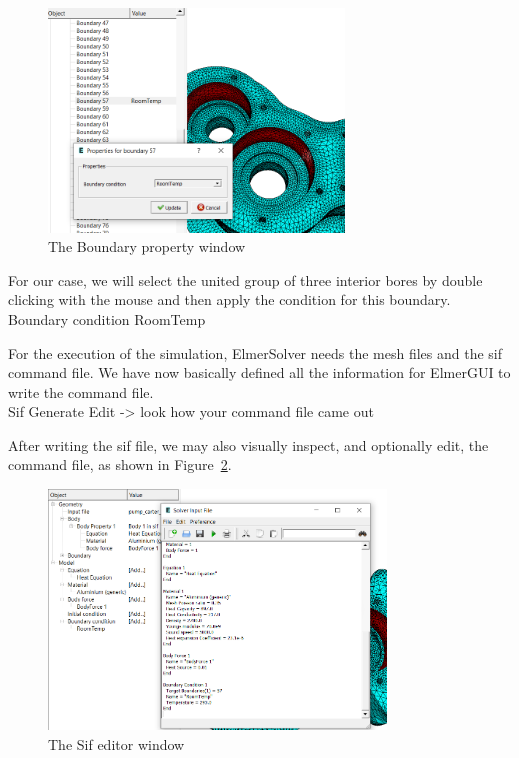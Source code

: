 \begin{figure}[H]
\begin{center}
\includegraphics[width=0.7\textwidth]{step-07}
\caption{The Boundary property window}\label{fg:step-07}
\end{center}
\end{figure}

For our case, we will select the united group of three interior bores by double clicking with the mouse and then apply the condition for this boundary.
\ttbegin
Boundary condition
  RoomTemp
\ttend

For the execution of the simulation, ElmerSolver needs the mesh files and the sif command file. We have now basically defined all the information for ElmerGUI to write the command file.\\

\ttbegin
Sif 
  Generate
  Edit -> look how your command file came out  
\ttend

After writing the sif file, we may also visually inspect, and optionally edit, the command file, as shown in Figure~\ref{fg:step-08}.

\begin{figure}[H]
\begin{center}
\includegraphics[width=0.8\textwidth]{step-08}
\caption{The Sif editor window}\label{fg:step-08}
\end{center}
\end{figure}

